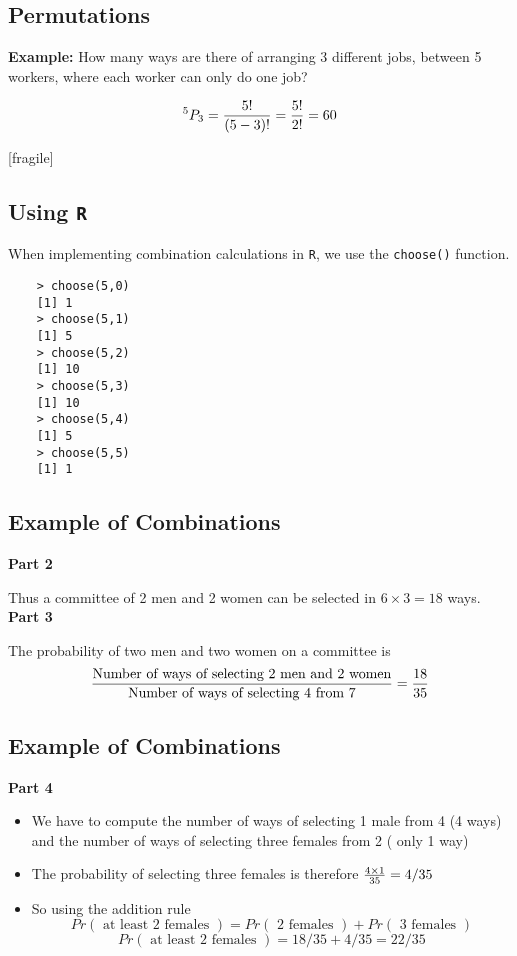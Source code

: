 \documentclass[]{report}
\begin{document}
	{
		\subsection{Permutations}
		\textbf{Example:}
		How many ways are there of arranging 3 different jobs, between 5 workers, where each worker can only do one job?
		
		
		\[ ^5 P_3 = \frac{5!}{(5-3)!}  = {5! \over 2!} = 60\]
		
	}
	
	
	

	
	[fragile]
	\subsection{Using \texttt{R}}
	When implementing combination calculations in \texttt{R}, we use the \texttt{choose()} function.
	
	\begin{verbatim}
	> choose(5,0)
	[1] 1
	> choose(5,1)
	[1] 5
	> choose(5,2)
	[1] 10
	> choose(5,3)
	[1] 10
	> choose(5,4)
	[1] 5
	> choose(5,5)
	[1] 1
	\end{verbatim}
	
	
	{
		\subsection{Example of Combinations}
		
		\textbf{Part 2}
		
		Thus a committee of 2 men and 2 women can be selected in $ 6 \times 3  = 18 $ ways.\\
		\bigskip
		\textbf{Part 3}
		
		The probability of two men and two women on a committee is
		\[ {\mbox{Number of ways of selecting 2 men and 2 women} \over \mbox{Number of ways of selecting 4 from 7}} = {18 \over 35 }\]
		
	}

	{
		\subsection{Example of Combinations}
		
		\textbf{Part 4}
		\begin{itemize}
			\item We have to compute the number of ways of selecting 1 male from 4 (4 ways) and the number of ways of selecting three females from 2 ( only 1 way)
			\item The probability of selecting three females is therefore ${4 \times 1 \over 35} = 4/35$
			\item So using the addition rule
			\[ Pr(\mbox{ at least 2 females }) = Pr(\mbox{ 2 females }) + Pr(\mbox{ 3 females }) \]
			\[ Pr(\mbox{ at least 2 females })  = 18/35 + 4/35 = 22/35 \]
		\end{itemize}
		
	}
	
\end{document}
